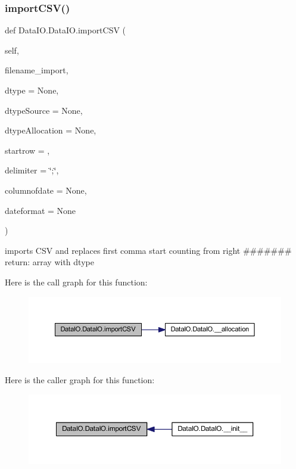 \subsubsection{\texorpdfstring{import\+C\+S\+V()}{importCSV()}}
{\footnotesize\ttfamily def Data\+I\+O.\+Data\+I\+O.\+import\+C\+SV (\begin{DoxyParamCaption}\item[{}]{self,  }\item[{}]{filename\+\_\+import,  }\item[{}]{dtype = {\ttfamily None},  }\item[{}]{dtype\+Source = {\ttfamily None},  }\item[{}]{dtype\+Allocation = {\ttfamily None},  }\item[{}]{startrow = {},  }\item[{}]{delimiter = {\ttfamily \char`\"{};\char`\"{}},  }\item[{}]{columnofdate = {\ttfamily None},  }\item[{}]{dateformat = {\ttfamily None} }\end{DoxyParamCaption})}

\begin{DoxyVerb}imports CSV and replaces first comma start counting from right
#######
return:
    array with dtype
\end{DoxyVerb}
 Here is the call graph for this function\+:
\nopagebreak
\begin{figure}[H]
\begin{center}
\leavevmode
\includegraphics[width=350pt]{class_data_i_o_1_1_data_i_o_aa79466ed985916b447e97c1b501ff30c_cgraph}
\end{center}
\end{figure}
Here is the caller graph for this function\+:
\nopagebreak
\begin{figure}[H]
\begin{center}
\leavevmode
\includegraphics[width=350pt]{class_data_i_o_1_1_data_i_o_aa79466ed985916b447e97c1b501ff30c_icgraph}
\end{center}
\end{figure}
\mbox{\label{class_data_i_o_1_1_data_i_o_a6c56e9c0444c5bfd36093fcd966053b0}} 
